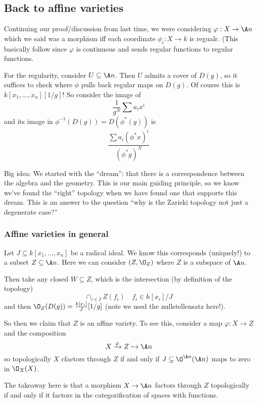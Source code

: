 \documentclass[12pt]{article}
\begin{document}
\subsection{Back to affine varieties}
Continuing our proof/discussion from last time, we were considering $\varphi:X\to\A n$ which we said was a morphism iff each coordinate $\phi_i:X\to k$ is regualr.
(This basically follow since $\varphi$ is continuous and sends regular functions to regular functions.

For the regularity, consider $U\subseteq\A n$. Then $U$ admits a cover of $D(g)$, so it suffices to check where $\phi$
pulls back regular maps on $D(g)$. Of course this is $k[x_1,\dots,x_n][1/g]$! So consider the image of 
\[\frac{1}{g^N}\sum a_ix^i\]
and its image in $\phi^{-1}(D(g))=D(\phi^\ast(g))$ is 
\[\frac{\sum a_i(\phi^\ast x)^i}{(\phi^\ast g)^N}\]

\begin{rmk}
	Big idea: We started with the ``dream'': that there is a correspondence between the algebra and the geometry. This is 
	our main guiding principle, so we know we've found the ``right'' topology when we have found one that supports this dream.
	This is an answer to the question ``why is the Zariski topology not just a degenerate case?''
\end{rmk}

\subsubsection{Affine varieties in general}
Let $J\subseteq k[x_1,\dots,x_n]$ be a radical ideal. We know this corresponds (uniquely!) 
to a subset $Z\subseteq \A n$. Here we can consider $(Z,\O_Z)$ where $Z$ is a subspace of $\A n$.

Then take any closed $W\subseteq Z$, which is the intersection (by definition of the topology)
\[\cap_{i\in I}Z(f_i)\quad f_i\in h[x_i]/J\]
and then $\O_Z(D(g))=\frac{k[x_i]}{J}[1/g]$ (note we used the nullstellensatz here!).

So then we claim that $Z$ is an affine variety. To see this, consider a map $\varphi:X\to Z$ and the composition
\[X\xrightarrow{\varphi} Z\hookrightarrow \A n\]
so topologically $X$ cfactors through $Z$ if and only if $J\subseteq \O^{\A n}(\A n)$ maps to zero in $\O_X(X)$.

The takeaway here is that a morphism $X\to\A n$ factors through $Z$ topologically if and only if it factors in the categorification of 
spaces with functions.
\end{document}
